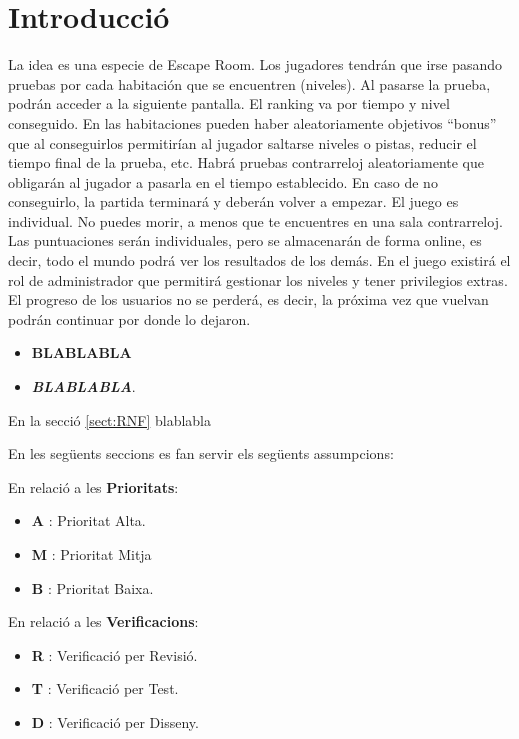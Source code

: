 \section{Introducció}\label{sec:intro}


La idea es una especie de Escape Room. Los jugadores tendrán que irse pasando pruebas por cada habitación que se encuentren (niveles). Al pasarse la prueba, podrán acceder a la siguiente pantalla. El ranking va por tiempo y nivel conseguido. En las habitaciones pueden haber aleatoriamente objetivos “bonus” que al conseguirlos permitirían al jugador saltarse niveles o pistas, reducir el tiempo final de la prueba, etc.
Habrá pruebas contrarreloj aleatoriamente que obligarán al jugador a pasarla en el tiempo establecido. En caso de no conseguirlo, la partida terminará y deberán volver a empezar.
El juego es individual. No puedes morir, a menos que te encuentres en una sala contrarreloj. 
Las puntuaciones serán individuales, pero se almacenarán de forma online, es decir, todo el mundo podrá ver los resultados de los demás.
En el juego existirá el rol de administrador que permitirá gestionar los niveles y tener privilegios extras.
El progreso de los usuarios no se perderá, es decir, la próxima vez que vuelvan podrán continuar por donde lo dejaron.


\begin{itemize}
\item  \textbf{BLABLABLA}
\item  \textit{\textbf{BLABLABLA}}.
\end{itemize}

En la secció \ref{sect:RNF} blablabla \newline \newline

En les següents seccions es fan servir els següents assumpcions:

En relació a les \textbf{Prioritats}:

\begin{itemize}
\item  \textbf{A} : Prioritat Alta.
\item  \textbf{M} : Prioritat Mitja
\item  \textbf{B} : Prioritat Baixa.
\end{itemize}

En relació a les \textbf{Verificacions}:

\begin{itemize}
\item  \textbf{R} : Verificació per Revisió.
\item  \textbf{T} : Verificació per Test.
\item  \textbf{D} : Verificació per Disseny.
\end{itemize}
